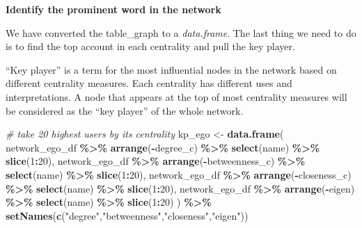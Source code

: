 \documentclass[
]{article}
\newenvironment{Shaded}{\begin{snugshade}}{\end{snugshade}}
\newcommand{\CommentTok}[1]{\textcolor[rgb]{0.56,0.35,0.01}{\textit{#1}}}
\newcommand{\DecValTok}[1]{\textcolor[rgb]{0.00,0.00,0.81}{#1}}
\newcommand{\FunctionTok}[1]{\textcolor[rgb]{0.13,0.29,0.53}{\textbf{#1}}}
\newcommand{\NormalTok}[1]{#1}
\newcommand{\OtherTok}[1]{\textcolor[rgb]{0.56,0.35,0.01}{#1}}
\newcommand{\SpecialCharTok}[1]{\textcolor[rgb]{0.81,0.36,0.00}{\textbf{#1}}}
\newcommand{\StringTok}[1]{\textcolor[rgb]{0.31,0.60,0.02}{#1}}
\begin{document}
\normalsize

\textbf{Identify the prominent word in the network}

We have converted the table\_graph to a \emph{data.frame}. The last thing we need to do is to find the top account in each centrality and pull the key player.

``Key player'' is a term for the most influential nodes in the network based on different centrality measures. Each centrality has different uses and interpretations. A node that appears at the top of most centrality measures will be considered as the ``key player'' of the whole network.

\footnotesize

\begin{Shaded}
\begin{Highlighting}[]
\CommentTok{\# take 20 highest users by its centrality}
\NormalTok{kp\_ego }\OtherTok{\textless{}{-}} \FunctionTok{data.frame}\NormalTok{(}
\NormalTok{  network\_ego\_df }\SpecialCharTok{\%\textgreater{}\%} \FunctionTok{arrange}\NormalTok{(}\SpecialCharTok{{-}}\NormalTok{degree\_c) }\SpecialCharTok{\%\textgreater{}\%} \FunctionTok{select}\NormalTok{(name) }\SpecialCharTok{\%\textgreater{}\%} \FunctionTok{slice}\NormalTok{(}\DecValTok{1}\SpecialCharTok{:}\DecValTok{20}\NormalTok{),}
\NormalTok{  network\_ego\_df }\SpecialCharTok{\%\textgreater{}\%} \FunctionTok{arrange}\NormalTok{(}\SpecialCharTok{{-}}\NormalTok{betweenness\_c) }\SpecialCharTok{\%\textgreater{}\%} \FunctionTok{select}\NormalTok{(name) }\SpecialCharTok{\%\textgreater{}\%} \FunctionTok{slice}\NormalTok{(}\DecValTok{1}\SpecialCharTok{:}\DecValTok{20}\NormalTok{),}
\NormalTok{  network\_ego\_df }\SpecialCharTok{\%\textgreater{}\%} \FunctionTok{arrange}\NormalTok{(}\SpecialCharTok{{-}}\NormalTok{closeness\_c) }\SpecialCharTok{\%\textgreater{}\%} \FunctionTok{select}\NormalTok{(name) }\SpecialCharTok{\%\textgreater{}\%} \FunctionTok{slice}\NormalTok{(}\DecValTok{1}\SpecialCharTok{:}\DecValTok{20}\NormalTok{),}
\NormalTok{  network\_ego\_df }\SpecialCharTok{\%\textgreater{}\%} \FunctionTok{arrange}\NormalTok{(}\SpecialCharTok{{-}}\NormalTok{eigen) }\SpecialCharTok{\%\textgreater{}\%} \FunctionTok{select}\NormalTok{(name) }\SpecialCharTok{\%\textgreater{}\%} \FunctionTok{slice}\NormalTok{(}\DecValTok{1}\SpecialCharTok{:}\DecValTok{20}\NormalTok{)}
\NormalTok{) }\SpecialCharTok{\%\textgreater{}\%} \FunctionTok{setNames}\NormalTok{(}\FunctionTok{c}\NormalTok{(}\StringTok{"degree"}\NormalTok{,}\StringTok{"betweenness"}\NormalTok{,}\StringTok{"closeness"}\NormalTok{,}\StringTok{"eigen"}\NormalTok{))}
\end{Highlighting}
\end{Shaded}
\end{document}
